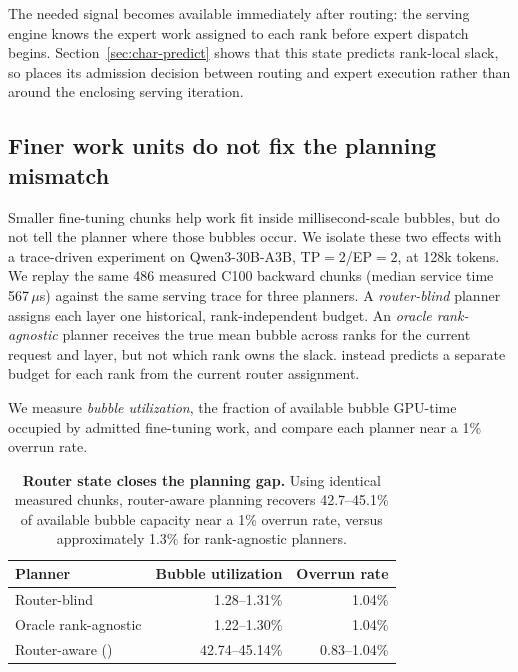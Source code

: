 The needed signal becomes available immediately after routing: the
serving engine knows the expert work assigned to each rank before expert
dispatch begins. Section~\ref{sec:char-predict} shows that this state
predicts rank-local slack, so \sys{} places its admission decision between
routing and expert execution rather than around the enclosing serving
iteration.

\subsection{Finer work units do not fix the planning mismatch}
\label{sec:gap-granularity}

Smaller fine-tuning chunks help work fit inside millisecond-scale bubbles,
but do not tell the planner where those bubbles occur. We isolate these
two effects with a trace-driven experiment on Qwen3-30B-A3B,
\ac{TP}$=2$/\ac{EP}$=2$, at 128k tokens. We replay the same 486
measured C100 backward chunks (median service time 567\,$\mu$s) against
the same serving trace for three planners. A \emph{router-blind} planner
assigns each layer one historical, rank-independent budget. An
\emph{oracle rank-agnostic} planner receives the true mean bubble across
ranks for the current request and layer, but not which rank owns the
slack. \sys{} instead predicts a separate budget for each rank from the
current router assignment.

We measure \emph{bubble utilization}, the fraction of available bubble
GPU-time occupied by admitted fine-tuning work, and compare each planner
near a 1\% overrun rate.

\begin{table}[t]
  \centering
  \small
  \caption{
    \textbf{Router state closes the planning gap.}
    Using identical measured chunks, router-aware planning recovers
    42.7--45.1\% of available bubble capacity near a 1\% overrun rate,
    versus approximately 1.3\% for rank-agnostic planners.
  }
  \label{tab:gap-planner}
  \begin{tabular}{lrr}
    \toprule
    Planner & Bubble utilization & Overrun rate \\
    \midrule
    Router-blind
    & 1.28--1.31\%
    & 1.04\% \\
    Oracle rank-agnostic
    & 1.22--1.30\%
    & 1.04\% \\
    Router-aware (\sys{})
    & 42.74--45.14\%
    & 0.83--1.04\% \\
    \bottomrule
  \end{tabular}
\end{table}

